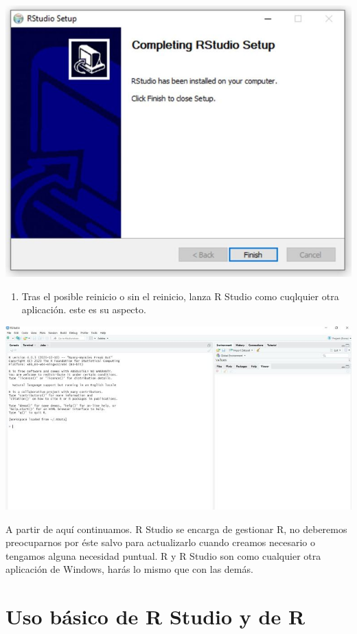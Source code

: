 \documentclass[
]{book}
\providecommand{\tightlist}{%
  \setlength{\itemsep}{0pt}\setlength{\parskip}{0pt}}
\begin{document}
\includegraphics{data/R10.jpg}

\begin{enumerate}
\def\labelenumi{\arabic{enumi}.}
\setcounter{enumi}{10}
\tightlist
\item
  Tras el posible reinicio o sin el reinicio, lanza R Studio como cuqlquier otra aplicación. este es su aspecto.
\end{enumerate}

\includegraphics{data/R11.jpg}

A partir de aquí continuamos. R Studio se encarga de gestionar R, no deberemos preocuparnos por éste salvo para actualizarlo cuando creamos necesario o tengamos alguna necesidad puntual. R y R Studio son como cualquier otra aplicación de Windows, harás lo mismo que con las demás.

\hypertarget{uso-buxe1sico-de-r-studio-y-de-r}{%
\section{Uso básico de R Studio y de R}\label{uso-buxe1sico-de-r-studio-y-de-r}}
\end{document}
